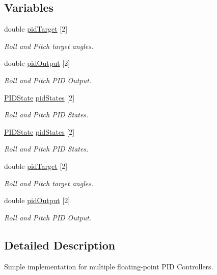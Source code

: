 \subsection*{Variables}
\begin{DoxyCompactItemize}
\item 
double \hyperlink{group__pid_ga260bc1ef7a231f2252e6e69e1e459ba6}{pid\-Target} \mbox{[}2\mbox{]}
\begin{DoxyCompactList}\small\item\em Roll and Pitch target angles. \end{DoxyCompactList}\item 
double \hyperlink{group__pid_ga5b70790e470e0c5812d24a8a098c01e0}{pid\-Output} \mbox{[}2\mbox{]}
\begin{DoxyCompactList}\small\item\em Roll and Pitch P\-I\-D Output. \end{DoxyCompactList}\item 
\hyperlink{struct_p_i_d_state}{P\-I\-D\-State} \hyperlink{group__pid_ga9ce36f9a8e0e12e30b448e0161e3e5ec}{pid\-States} \mbox{[}2\mbox{]}
\begin{DoxyCompactList}\small\item\em Roll and Pitch P\-I\-D States. \end{DoxyCompactList}\item 
\hyperlink{struct_p_i_d_state}{P\-I\-D\-State} \hyperlink{group__pid_ga9ce36f9a8e0e12e30b448e0161e3e5ec}{pid\-States} \mbox{[}2\mbox{]}
\begin{DoxyCompactList}\small\item\em Roll and Pitch P\-I\-D States. \end{DoxyCompactList}\item 
double \hyperlink{group__pid_ga260bc1ef7a231f2252e6e69e1e459ba6}{pid\-Target} \mbox{[}2\mbox{]}
\begin{DoxyCompactList}\small\item\em Roll and Pitch target angles. \end{DoxyCompactList}\item 
double \hyperlink{group__pid_ga5b70790e470e0c5812d24a8a098c01e0}{pid\-Output} \mbox{[}2\mbox{]}
\begin{DoxyCompactList}\small\item\em Roll and Pitch P\-I\-D Output. \end{DoxyCompactList}\end{DoxyCompactItemize}


\subsection{Detailed Description}
Simple implementation for multiple floating-\/point P\-I\-D Controllers. 

